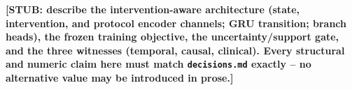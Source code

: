 \textbf{[STUB: describe the intervention-aware architecture (state,
intervention, and protocol encoder channels; GRU transition; branch
heads), the frozen training objective, the uncertainty/support gate, and
the three witnesses (temporal, causal, clinical). Every structural and
numeric claim here must match \texttt{decisions.md} exactly -- no
alternative value may be introduced in prose.]}
